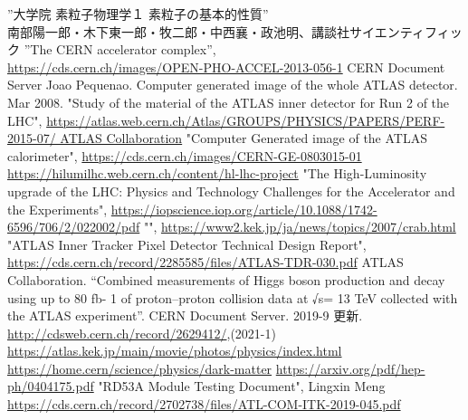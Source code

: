 \begin{thebibliography}{24}
”大学院 素粒子物理学１ 素粒子の基本的性質” \\ 南部陽一郎・木下東一郎・牧二郎・中西襄・政池明、講談社サイエンティフィック
”The CERN accelerator complex”,\\ \url{https://cds.cern.ch/images/OPEN-PHO-ACCEL-2013-056-1} CERN Document Server
Joao Pequenao. Computer generated image of the whole ATLAS detector. Mar 2008.
"Study of the material of the ATLAS inner detector for Run 2 of the LHC", \url{https://atlas.web.cern.ch/Atlas/GROUPS/PHYSICS/PAPERS/PERF-2015-07/ ATLAS Collaboration}
"Computer Generated image of the ATLAS calorimeter", \url{https://cds.cern.ch/images/CERN-GE-0803015-01}
\url{https://hilumilhc.web.cern.ch/content/hl-lhc-project}
"The High-Luminosity upgrade of the LHC: Physics and Technology Challenges for the Accelerator and the Experiments", \url{https://iopscience.iop.org/article/10.1088/1742-6596/706/2/022002/pdf}
"", \url{https://www2.kek.jp/ja/news/topics/2007/crab.html}
"ATLAS Inner Tracker Pixel Detector Technical Design Report", \url{https://cds.cern.ch/record/2285585/files/ATLAS-TDR-030.pdf}
ATLAS Collaboration. “Combined measurements of Higgs boson production and decay using up to 80 fb- 1 of proton–proton collision data at √s= 13 TeV collected with the ATLAS experiment”. CERN Document Server. 2019-9 更新. \url{http://cdsweb.cern.ch/record/2629412/},(2021-1)
\url{https://atlas.kek.jp/main/movie/photos/physics/index.html}
\url{https://home.cern/science/physics/dark-matter}
\url{https://arxiv.org/pdf/hep-ph/0404175.pdf}
"RD53A Module Testing Document", Lingxin Meng\\ \url{https://cds.cern.ch/record/2702738/files/ATL-COM-ITK-2019-045.pdf}
\end{thebibliography}
